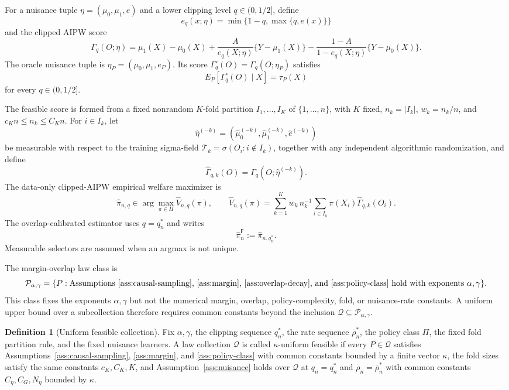 \documentclass[11pt]{article}
\theoremstyle{definition}
\newtheorem{definition}{Definition}
\theoremstyle{plain}
\theoremstyle{remark}
\begin{document}
For a nuisance tuple \(\eta=(\mu_0,\mu_1,e)\) and a lower clipping level
\(q\in(0,1/2]\), define
\[
e_q(x;\eta)=\min\{1-q,\max\{q,e(x)\}\}
\]
and the clipped AIPW score
\[
\Gamma_q(O;\eta)=\mu_1(X)-\mu_0(X)
+\frac{A}{e_q(X;\eta)}\{Y-\mu_1(X)\}
-\frac{1-A}{1-e_q(X;\eta)}\{Y-\mu_0(X)\}.
\]
The oracle nuisance tuple is \(\eta_P=(\mu_0,\mu_1,e_P)\).  Its score
\(\Gamma_q^\circ(O)=\Gamma_q(O;\eta_P)\) satisfies
\[
E_P[\Gamma_q^\circ(O)\mid X]=\tau_P(X)
\]
for every \(q\in(0,1/2]\).

The feasible score is formed from a fixed nonrandom \(K\)-fold partition
\(I_1,\ldots,I_K\) of \(\{1,\ldots,n\}\), with \(K\) fixed,
\(n_k=|I_k|\), \(w_k=n_k/n\), and \(c_Kn\le n_k\le C_Kn\).  For
\(i\in I_k\), let
\[
\widehat\eta^{(-k)}=(\widehat\mu_0^{(-k)},\widehat\mu_1^{(-k)},
\widehat e^{(-k)})
\]
be measurable with respect to the training sigma-field
\(\mathcal T_k=\sigma(O_i:i\notin I_k)\), together with any independent
algorithmic randomization, and define
\[
\widehat\Gamma_{q,k}(O)=\Gamma_q(O;\widehat\eta^{(-k)}).
\]
The data-only clipped-AIPW empirical welfare maximizer is
\[
\widehat\pi_{n,q}\in\arg\max_{\pi\in\Pi}
\widehat V_{n,q}(\pi),\qquad
\widehat V_{n,q}(\pi)=
\sum_{k=1}^K w_k\, n_k^{-1}\sum_{i\in I_k}
\pi(X_i)\widehat\Gamma_{q,k}(O_i).
\]
The overlap-calibrated estimator uses \(q=q_n^*\) and writes
\[
\widehat\pi_{n}^{\mathsf F}:=\widehat\pi_{n,q_n^*}.
\]
Measurable selectors are assumed when an argmax is not unique.

The margin-overlap law class is
\[
\mathcal P_{\alpha,\gamma}
=\{P:\text{Assumptions~\ref{ass:causal-sampling},
\ref{ass:margin}, \ref{ass:overlap-decay}, and
\ref{ass:policy-class} hold with exponents }\alpha,\gamma\}.
\]
This class fixes the exponents \(\alpha,\gamma\) but not the numerical
margin, overlap, policy-complexity, fold, or nuisance-rate constants.  A
uniform upper bound over a subcollection therefore requires common constants
beyond the inclusion \(\mathcal Q\subseteq\mathcal P_{\alpha,\gamma}\).

\begin{definition}[Uniform feasible collection]\label{def:uniform-feasible-collection}
Fix \(\alpha,\gamma\), the clipping sequence \(q_n^*\), the rate sequence
\(\bar\rho_n^*\), the policy class \(\Pi\), the fixed fold partition rule,
and the fixed nuisance learners.  A law collection \(\mathcal Q\) is called
\(\kappa\)-uniform feasible if every \(P\in\mathcal Q\) satisfies
Assumptions~\ref{ass:causal-sampling}, \ref{ass:margin}, and
\ref{ass:policy-class} with common constants bounded by a finite vector
\(\kappa\), the fold sizes satisfy the same constants \(c_K,C_K,K\), and
Assumption~\ref{ass:nuisance} holds over \(\mathcal Q\) at
\(q_n=q_n^*\) and \(\rho_n=\bar\rho_n^*\) with common constants
\(C_\eta,C_G,N_\eta\) bounded by \(\kappa\).
\end{definition}
\end{document}
